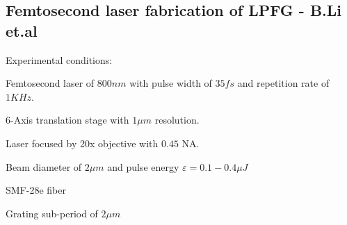 \documentclass[11pt, openright]{book}
\begin{document}
        
         \subsection*{Femtosecond laser fabrication of LPFG - B.Li et.al}

        Experimental conditions:
         \begin{items}{-15pt}{-15pt}
            \item Femtosecond laser of $800nm$ with pulse width of $35fs$ and repetition rate of $1KHz$.
            \item 6-Axis translation stage with $1\mu m$ resolution.
            \item Laser focused by 20x objective with $0.45$ NA. 
            \item Beam diameter of $2\mu m$ and pulse energy $\varepsilon=0.1-0.4\mu J$ 
            \item SMF-28e fiber
            \item Grating sub-period of $2\mu m$ 
        \end{items}
\end{document}
